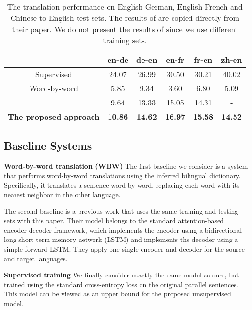 \documentclass[11pt,a4paper]{article}
\begin{document}
\begin{table*}[htb]
			\centering
				\begin{tabular}{c|ccccc}
					\toprule[2pt]
					 & en-de	& de-en	&	en-fr &   fr-en & zh-en\\
					\midrule[1pt]
					Supervised  &   24.07    &   26.99      &  30.50       &   30.21 &  40.02   \\
                    Word-by-word  &   5.85    &  9.34       &   3.60      &  6.80  & 5.09    \\
					\citet{Lample2017Unsupervised}  &  9.64     &    13.33     &     15.05    &    14.31  & - \\
                    \midrule[1pt]
                    \bf{The proposed approach} &    \bf{10.86} & \bf{14.62} & \bf{16.97} & \bf{15.58}& \bf{14.52}  \\
					\bottomrule[2pt]
				\end{tabular}
				\caption{\label{tab:MainResult} The translation performance on English-German, English-French and Chinese-to-English test sets. The results of \cite{Lample2017Unsupervised} are copied directly from their paper. We do not present the results of \cite{Artetxe2017Unsupervised} since we use different training sets.}
\end{table*}

\subsection{Baseline Systems}
\textbf{Word-by-word translation (WBW)} The first baseline we consider is a system that performs word-by-word translations using the inferred bilingual dictionary. Specifically, it translates a sentence word-by-word, replacing each word with its nearest neighbor in the other language.

\textbf{\citet{Lample2017Unsupervised}} The second baseline is a previous work that uses the same training and testing sets with this paper. Their model belongs to the standard attention-based encoder-decoder framework, which implements the encoder using a bidirectional long short term memory network (LSTM) and implements the decoder using a simple forward LSTM. They apply one single encoder and decoder for the source and target languages.

\textbf{Supervised training} We finally consider exactly the same model as ours, but trained using the standard cross-entropy loss on the original parallel sentences. This model can be viewed as an upper bound for the proposed unsupervised model.
\end{document}
